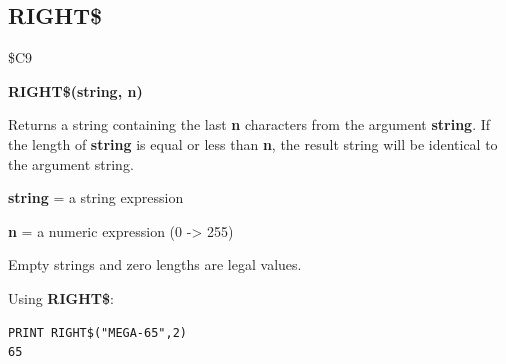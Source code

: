 
\newpage
\subsection{RIGHT\$}
\begin{description}[leftmargin=2cm,style=nextline]
\item [Token:] \$C9
\item [Format:] {\bf RIGHT\$(string, n)}
\item [Usage:] Returns a string
               containing the last {\bf n} characters from the
               argument {\bf string}.
               If the length of {\bf string} is equal or less than {\bf n},
               the result string will be identical to the argument string.

               {\bf string} = a string expression

               {\bf n} = a numeric expression (0 -> 255)

\item [Remarks:] Empty strings and zero lengths are legal values.

\item [Example:] Using {\bf RIGHT\$}:
\begin{tcolorbox}[colback=black,coltext=white]
\verbatimfont{\codefont}
\begin{verbatim}
PRINT RIGHT$("MEGA-65",2)
65
\end{verbatim}
\end{tcolorbox}
\end{description}


\newpage
